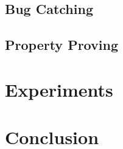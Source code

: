 \documentclass{llncs}
\begin{document}
\subsection{Bug Catching}
\label{subsection:bug-catching}

\subsection{Property Proving}
\label{subsection:property-proving}


\section{Experiments}
\label{section:experiments}



\section{Conclusion}
\label{section:conclusion}




\end{document}

